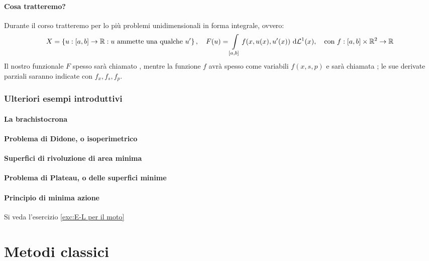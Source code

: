 \documentclass[openany]{book}
\begin{document}
\subsubsection*{Cosa tratteremo?}

Durante il corso tratteremo per lo più problemi unidimensionali in forma integrale, ovvero:
\[ X = \left\{ u : [a,b]\to \R : u\text{ ammette una qualche } u' \right\}, \quad F(u) = \intop_{[a,b]} f(x,u(x), u'(x))\de\L^1(x), \quad\text{con } f: [a,b]\times\R^2\to\R \]
Il nostro funzionale $F$ spesso sarà chiamato , mentre la funzione $f$ avrà spesso come variabili $f(x,s,p)$ e sarà chiamata ; le sue derivate parziali saranno indicate con $f_x, f_s, f_p$.

\subsection*{Ulteriori esempi introduttivi}

\subsubsection*{La brachistocrona}

\subsubsection*{Problema di Didone, o isoperimetrico}

\subsubsection*{Superfici di rivoluzione di area minima}

\subsubsection*{Problema di Plateau, o delle superfici minime}

\subsubsection*{Principio di minima azione}

Si veda l'esercizio \ref{exc:E-L per il moto}

\chapter{Metodi classici}
\end{document}
